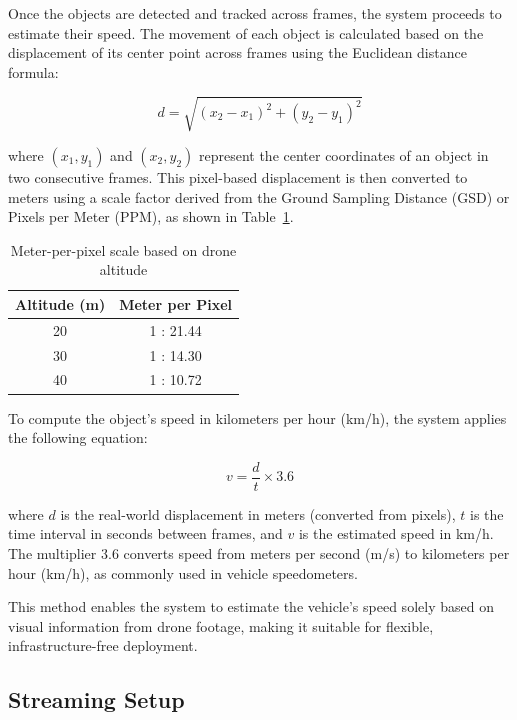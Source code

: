Once the objects are detected and tracked across frames, the system proceeds to estimate their speed. The movement of each object is calculated based on the displacement of its center point across frames using the Euclidean distance formula:

\begin{equation}
\label{eq:euclidean}
d = \sqrt{(x_2 - x_1)^2 + (y_2 - y_1)^2}
\end{equation}

where $(x_1, y_1)$ and $(x_2, y_2)$ represent the center coordinates of an object in two consecutive frames. This pixel-based displacement is then converted to meters using a scale factor derived from the Ground Sampling Distance (GSD) or Pixels per Meter (PPM), as shown in Table~\ref{tbl:skala_ppm}.

\begin{table}[H]
\centering
\caption{Meter-per-pixel scale based on drone altitude}
\label{tbl:skala_ppm}
\begin{tabular}{|c|c|}
\hline
\textbf{Altitude (m)} & \textbf{Meter per Pixel} \\ \hline
20 & 1 : 21.44 \\ \hline
30 & 1 : 14.30 \\ \hline
40 & 1 : 10.72 \\ \hline
\end{tabular}
\end{table}

To compute the object’s speed in kilometers per hour (km/h), the system applies the following equation:

\begin{equation}
\label{eq:speed_ms}
v = \frac{d}{t} \times 3.6
\end{equation}

where $d$ is the real-world displacement in meters (converted from pixels), $t$ is the time interval in seconds between frames, and $v$ is the estimated speed in km/h. The multiplier 3.6 converts speed from meters per second (m/s) to kilometers per hour (km/h), as commonly used in vehicle speedometers.

This method enables the system to estimate the vehicle's speed solely based on visual information from drone footage, making it suitable for flexible, infrastructure-free deployment.

\subsection{Streaming Setup}

